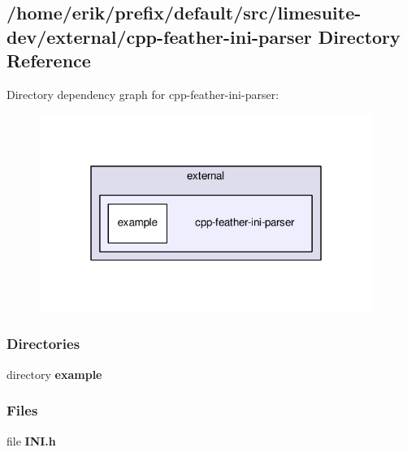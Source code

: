 \subsection{/home/erik/prefix/default/src/limesuite-\/dev/external/cpp-\/feather-\/ini-\/parser Directory Reference}
\label{dir_a286cd695a9d718dcf1f9576ed9feaa6}
Directory dependency graph for cpp-\/feather-\/ini-\/parser\+:
\nopagebreak
\begin{figure}[H]
\begin{center}
\leavevmode
\includegraphics[width=308pt]{dir_a286cd695a9d718dcf1f9576ed9feaa6_dep}
\end{center}
\end{figure}
\subsubsection*{Directories}
\begin{DoxyCompactItemize}
\item 
directory {\bf example}
\end{DoxyCompactItemize}
\subsubsection*{Files}
\begin{DoxyCompactItemize}
\item 
file {\bf I\+N\+I.\+h}
\end{DoxyCompactItemize}
